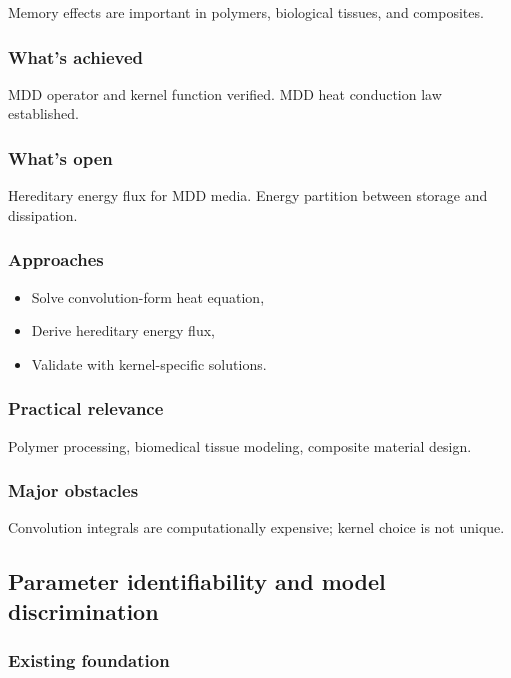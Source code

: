 Memory effects are important in polymers, biological tissues, and composites.

\subsubsection{What's achieved}

MDD operator and kernel function verified. MDD heat conduction law established.

\subsubsection{What's open}

Hereditary energy flux for MDD media. Energy partition between storage and dissipation.

\subsubsection{Approaches}

\begin{itemize}
\item Solve convolution-form heat equation,
\item Derive hereditary energy flux,
\item Validate with kernel-specific solutions.
\end{itemize}

\subsubsection{Practical relevance}

Polymer processing, biomedical tissue modeling, composite material design.

\subsubsection{Major obstacles}

Convolution integrals are computationally expensive; kernel choice is not unique.

\subsection{Parameter identifiability and model discrimination}
\label{sec:15.8}

\subsubsection{Existing foundation}

